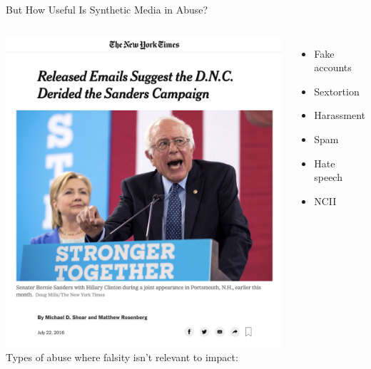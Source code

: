 \documentclass[nobackground,dvipsnames,table,aspectratio=169]{beamer}
\begin{document}
\begin{frame}{But How Useful Is Synthetic Media in Abuse?}
    \begin{columns}
            \includegraphics[width=\textwidth]{sanders-nyt}
            Types of abuse where falsity isn’t relevant to impact:
            \begin{itemize}
                \item Fake accounts
                \item Sextortion
                \item Harassment
                \item Spam
                \item Hate speech
                \item NCII
            \end{itemize}
    \end{columns}
\end{frame}
\end{document}
